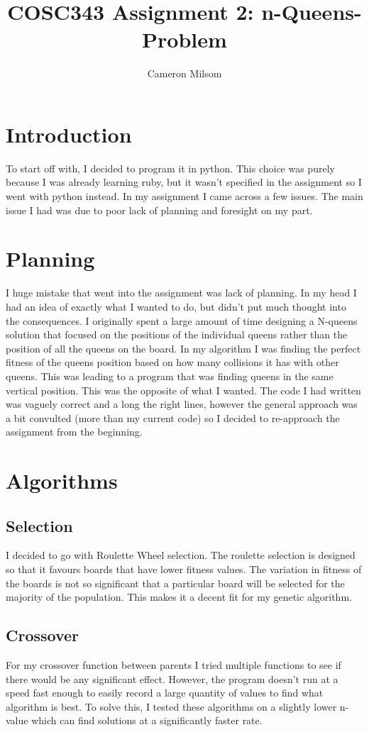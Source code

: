 \documentclass[a4paper,11pt]{article}
\title{COSC343 Assignment 2: n-Queens-Problem}
\author{Cameron Milsom}
\begin{document}
\maketitle

\section{Introduction}
To start off with, I decided to program it in python. This choice was purely because I was already learning ruby, but it wasn't specified in the assignment so I went with python instead.
In my assignment I came across a few issues. The main issue I had was due to poor lack of planning and foresight on my part.


\section{Planning}
I huge mistake that went into the assignment was lack of planning. In my head I had an idea of exactly what I wanted to do, but didn't put much thought into the consequences.
I originally spent a large amount of time designing a N-queens solution that focused on the positions of the individual queens rather than the position of all the queens on the board.
In my algorithm I was finding the perfect fitness of the queens position based on how many collisions it has with other queens. This was leading to a program that was finding queens in the same vertical position. This was the opposite of what I wanted.
The code I had written was vaguely correct and a long the right lines, however the general approach was a bit convulted (more than my current code) so I decided to re-approach the assignment from the beginning. 

\section*{Algorithms}

\subsection*{Selection}
I decided to go with Roulette Wheel selection. The roulette selection is designed so that it favours boards that have lower fitness values. The variation in fitness of the boards is not so significant that a particular board will be selected for the majority of the population. This makes it a decent fit for my genetic algorithm.

\subsection*{Crossover}
For my crossover function between parents I tried multiple functions to see if there would be any significant effect.
However, the program doesn't run at a speed fast enough to easily record a large quantity of values to find what algorithm is best.
To solve this, I tested these algorithms on a slightly lower n-value which can find solutions at a significantly faster rate.
\end{document}
